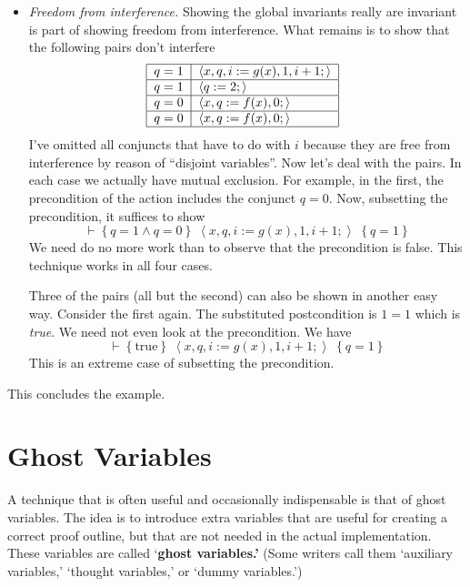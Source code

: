 \documentclass[muchmore,11pt]{article}%
\begin{document}
\begin{itemize}
\item \emph{Freedom from interference.} Showing the global invariants really
are invariant is part of showing freedom from interference. What remains is to
show that the following pairs don't interfere%
\[%
\begin{tabular}
[c]{|l|l|}\hline
$q=1$ & $\left\langle x,q,i:=g(x),1,i+1;\right\rangle $\\\hline
$q=1$ & $\left\langle q:=2;\right\rangle $\\\hline
$q=0$ & $\left\langle x,q:=f(x),0;\right\rangle $\\\hline
$q=0$ & $\left\langle x,q:=f(x),0;\right\rangle $\\\hline
\end{tabular}
\ \
\]
I've omitted all conjuncts that have to do with $i$ because they are free from
interference by reason of \textquotedblleft disjoint
variables\textquotedblright. Now let's deal with the pairs. In each case we
actually have mutual exclusion. For example, in the first, the precondition of
the action includes the conjunct $q=0$. Now, subsetting the precondition, it
suffices to show%
\[
\vdash\left\{  q=1\wedge q=0\right\}  \;\left\langle
x,q,i:=g(x),1,i+1;\right\rangle \;\left\{  q=1\right\}
\]
We need do no more work than to observe that the precondition is false. This
technique works in all four cases.

Three of the pairs (all but the second) can also be shown in another easy way.
Consider the first again. The substituted postcondition is $1=1$ which is
\textit{true}. We need not even look at the precondition. We have%
\[
\vdash\left\{  \mathrm{true}\right\}  \;\left\langle
x,q,i:=g(x),1,i+1;\right\rangle \;\left\{  q=1\right\}
\]
This is an extreme case of subsetting the precondition.
\end{itemize}

This concludes the example.

\section{Ghost Variables\label{ghost}}

A technique that is often useful and occasionally indispensable is that of
ghost variables. The idea is to introduce extra variables that are useful for
creating a correct proof outline, but that are not needed in the actual
implementation. These variables are called `\textbf{ghost variables.'} (Some
writers call them `auxiliary variables,' `thought variables,' or `dummy variables.')
\end{document}
